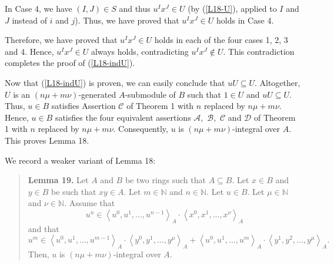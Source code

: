 \documentclass[12pt,final,notitlepage,onecolumn]{article}%
\begin{document}
In Case 4, we have $\left(  I,J\right)  \in S$ and thus $u^{I}x^{J}\in U$ (by
(\ref{L18-U}), applied to $I$ and $J$ instead of $i$ and $j$). Thus, we have
proved that $u^{I}x^{J}\in U$ holds in Case 4.

Therefore, we have proved that $u^{I}x^{J}\in U$ holds in each of the four
cases 1, 2, 3 and 4. Hence, $u^{I}x^{J}\in U$ always holds, contradicting
$u^{I}x^{J}\notin U$. This contradiction completes the proof of
(\ref{L18-indU}).

Now that (\ref{L18-indU}) is proven, we can easily conclude that $uU\subseteq
U$. Altogether, $U$ is an $\left(  n\mu+m\nu\right)  $-generated $A$-submodule
of $B$ such that $1\in U$ and $uU\subseteq U$. Thus, $u\in B$ satisfies
Assertion $\mathcal{C}$ of Theorem 1 with $n$ replaced by $n\mu+m\nu$. Hence,
$u\in B$ satisfies the four equivalent assertions $\mathcal{A},$
$\mathcal{B},$ $\mathcal{C}$ and $\mathcal{D}$ of Theorem 1 with $n$ replaced
by $n\mu+m\nu$. Consequently, $u$ is $\left(  n\mu+m\nu\right)  $-integral
over $A$. This proves Lemma 18.

We record a weaker variant of Lemma 18:

\begin{quote}
\textbf{Lemma 19.} Let $A$ and $B$ be two rings such that $A\subseteq B$. Let
$x\in B$ and $y\in B$ be such that $xy\in A$. Let $m\in\mathbb{N}$ and
$n\in\mathbb{N}$. Let $u\in B$. Let $\mu\in\mathbb{N}$ and $\nu\in\mathbb{N}$.
Assume that%
\begin{equation}
u^{n}\in\left\langle u^{0},u^{1},...,u^{n-1}\right\rangle _{A}\cdot
\left\langle x^{0},x^{1},...,x^{\nu}\right\rangle _{A} \label{L19-1}%
\end{equation}
and that%
\begin{equation}
u^{m}\in\left\langle u^{0},u^{1},...,u^{m-1}\right\rangle _{A}\cdot
\left\langle y^{0},y^{1},...,y^{\mu}\right\rangle _{A}+\left\langle
u^{0},u^{1},...,u^{m}\right\rangle _{A}\cdot\left\langle y^{1},y^{2}%
,...,y^{\mu}\right\rangle _{A}. \label{L19-2}%
\end{equation}
Then, $u$ is $\left(  n\mu+m\nu\right)  $-integral over $A$.
\end{quote}
\end{document}
